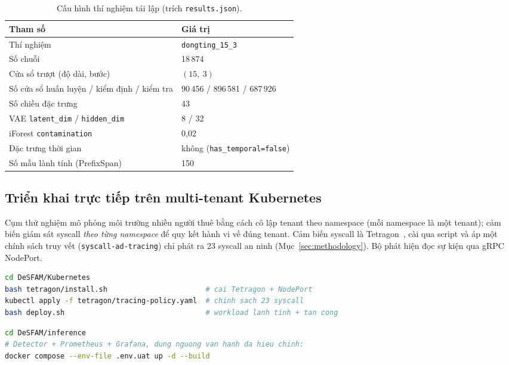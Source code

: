 \begin{table}[htbp]
  \centering
  \caption{Cấu hình thí nghiệm tái lập (trích \texttt{results.json}).}
  \label{tab:config}
  \begin{tabular}{ll}
    \toprule
    \textbf{Tham số} & \textbf{Giá trị} \\
    \midrule
    Thí nghiệm & \texttt{dongting\_15\_3} \\
    Số chuỗi & 18\,874 \\
    Cửa sổ trượt (độ dài, bước) & $(15,\ 3)$ \\
    Số cửa sổ huấn luyện / kiểm định / kiểm tra & 90\,456 / 896\,581 / 687\,926 \\
    Số chiều đặc trưng & 43 \\
    VAE \texttt{latent\_dim} / \texttt{hidden\_dim} & 8 / 32 \\
    iForest \texttt{contamination} & 0{,}02 \\
    Đặc trưng thời gian & không (\texttt{has\_temporal=false}) \\
    Số mẫu lành tính (PrefixSpan) & 150 \\
    \bottomrule
  \end{tabular}
\end{table}

\subsection{Triển khai trực tiếp trên multi-tenant Kubernetes}
Cụm thử nghiệm mô phỏng môi trường nhiều người thuê bằng cách cô lập tenant theo
namespace (mỗi namespace là một tenant); cảm biến giám sát syscall \emph{theo từng
namespace} để quy kết hành vi về đúng tenant. Cảm biến syscall là
Tetragon~\cite{tetragon}, cài qua script và áp một chính sách truy vết
(\texttt{syscall-ad-tracing}) chỉ phát ra 23 syscall an ninh
(Mục~\ref{sec:methodology}). Bộ phát hiện đọc sự kiện qua gRPC NodePort.

\begin{lstlisting}[language=bash]
cd DeSFAM/Kubernetes
bash tetragon/install.sh                       # cai Tetragon + NodePort
kubectl apply -f tetragon/tracing-policy.yaml  # chinh sach 23 syscall
bash deploy.sh                                 # workload lanh tinh + tan cong
\end{lstlisting}

\begin{lstlisting}[language=bash]
cd DeSFAM/inference
# Detector + Prometheus + Grafana, dung nguong van hanh da hieu chinh:
docker compose --env-file .env.uat up -d --build
\end{lstlisting}


